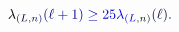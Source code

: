 \documentclass[12pt]{article}
\begin{document}
\makeatletter
\renewcommand*{\@textcolor}[3]{%
  \protect\leavevmode
  \begingroup
    \color#1{#2}#3%
  \endgroup
}
\makeatother
\begin{displaymath}
\mathcolor[RGB]{0,0,15}{\lambda} _ { \mathcolor[RGB]{0,0,30}{(} \mathcolor[RGB]{0,0,45}{L} \mathcolor[RGB]{0,0,60}{,} \mathcolor[RGB]{0,0,75}{n} \mathcolor[RGB]{0,0,90}{)} } \mathcolor[RGB]{0,0,105}{(} \mathcolor[RGB]{0,0,120}{\ell} \mathcolor[RGB]{0,0,135}{+} \mathcolor[RGB]{0,0,150}{1} \mathcolor[RGB]{0,0,165}{)} \mathcolor[RGB]{0,0,180}{\geq} \mathcolor[RGB]{0,0,195}{2} \mathcolor[RGB]{0,0,210}{5} \mathcolor[RGB]{0,0,225}{\lambda} _ { \mathcolor[RGB]{0,0,240}{(} \mathcolor[RGB]{0,0,255}{L} \mathcolor[RGB]{0,15,0}{,} \mathcolor[RGB]{0,15,15}{n} \mathcolor[RGB]{0,15,30}{)} } \mathcolor[RGB]{0,15,45}{(} \mathcolor[RGB]{0,15,60}{\ell} \mathcolor[RGB]{0,15,75}{)} \mathcolor[RGB]{0,15,90}{.}
\end{displaymath}
\end{document}
